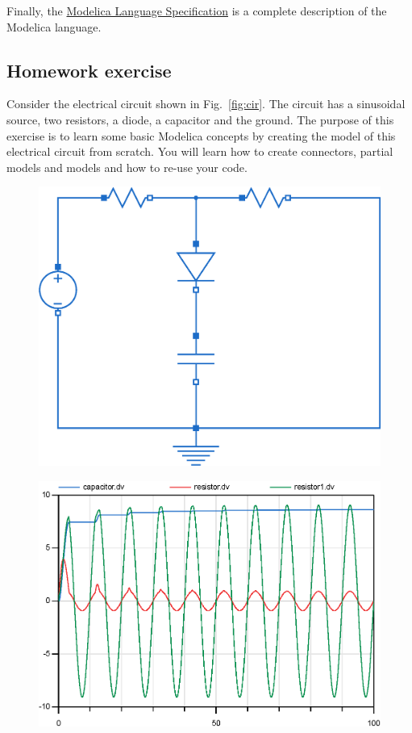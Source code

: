 \documentclass[10pt,a4paper]{article}
\begin{document}
Finally, the \href{https://modelica.org/documents/MLS.pdf}{Modelica Language Specification} is a complete description of the Modelica language.

\subsection*{Homework exercise}
Consider the electrical circuit shown in Fig.~\ref{fig:cir}. The circuit has a sinusoidal source, two resistors, a diode, a capacitor and the ground. The purpose of this exercise is to learn some basic Modelica concepts by creating the model of this electrical circuit from scratch. You will learn how to create connectors, partial models and models and how to re-use your code.

\begin{figure}[h]
	\centering
	\begin{minipage}{.4\textwidth}
		\centering
		\includegraphics[width=1\linewidth]{images/circuit.eps}
		\label{fig:cir}
	\end{minipage}%
	\begin{minipage}{.6\textwidth}
		\centering
		\includegraphics[width=.8\linewidth]{images/result.eps}
		\label{fig:res}
	\end{minipage}
\end{figure}
\end{document}
